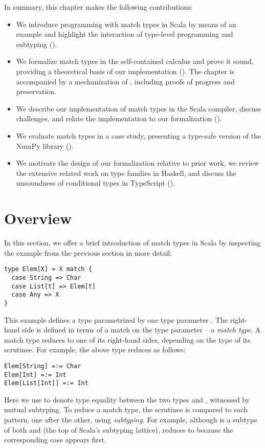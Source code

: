 In summary, this chapter makes the following contributions:
%
\begin{itemize}
  \item We introduce programming with match types in Scala by means of an example and highlight the interaction of type-level programming and subtyping ().

  \item We formalize match types in the self-contained calculus \SystemFm and prove it sound, providing a theoretical basis of our implementation (). The chapter is accompanied by a mechanization of \SystemFm, including proofs of progress and preservation.

  \item We describe our implementation of match types in the Scala compiler, discuss challenges, and relate the implementation to our formalization ().

  \item We evaluate match types in a case study, presenting a type-safe version of the NumPy library ().

  \item We motivate the design of our formalization relative to prior work, we review the extensive related work on type families in Haskell, and discuss the unsoundness of conditional types in TypeScript ().
\end{itemize}

\section{Overview}
\label{sec:overview}

In this section, we offer a brief introduction of match types in Scala by inspecting the example from the previous section in more detail:
%
\begin{lstlisting}
type Elem[X] = X match {
  case String => Char
  case List[t] => Elem[t]
  case Any => X
}
\end{lstlisting}
%
This example defines a type  parametrized by one type parameter . The right-hand side is defined in terms of a match on the type parameter -- a \emph{match type}.
A match type reduces to one of its right-hand sides, depending on the type of its scrutinee.
For example, the above type reduces as follows:
%
\begin{lstlisting}
Elem[String] =:= Char
Elem[Int] =:= Int
Elem[List[Int]] =:= Int
\end{lstlisting}
%
Here we use  to denote type equality between the two types  and , witnessed by mutual subtyping.
To reduce a match type, the scrutinee is compared to each pattern, one after the other, using \emph{subtyping}.
For example, although  is a subtype of both  and  (the top of Scala's subtyping lattice),  reduces to  because the corresponding case appears first.


